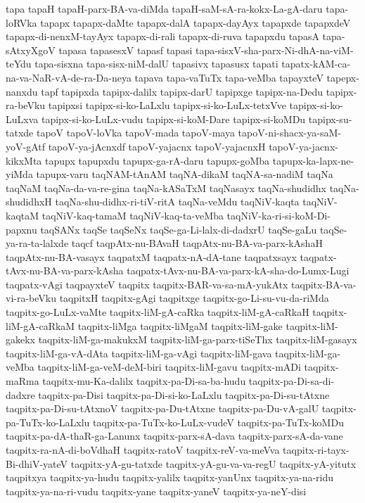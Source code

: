 {tapa
tapaH
tapaH-parx-BA-va-diMda
tapaH-saM-sA-ra-kokx-La-gA-daru
tapa-loRVka
tapapx
tapapx-daMte
tapapx-dalA
tapapx-dayAyx
tapapxde
tapapxdeV
tapapx-di-nenxM-tayAyx
tapapx-di-rali
tapapx-di-ruva
tapapxdu
tapasA
tapa-sAtxyXgoV
tapasa
tapasesxV
tapasf
tapasi
tapa-sisxV-sha-parx-Ni-dhA-na-viM-teYdu
tapa-sisxna
tapa-sisx-niM-dalU
tapasivx
tapasusx
tapati
tapatx-kAM-ca-na-va-NaR-vA-de-ra-Da-neya
tapava
tapa-vaTuTx
tapa-veMba
tapayxteV
tapepx-nanxdu
tapf
tapipxda
tapipx-dalilx
tapipx-darU
tapipxge
tapipx-na-Dedu
tapipx-ra-beVku
tapipxsi
tapipx-si-ko-LaLxlu
tapipx-si-ko-LuLx-tetxVve
tapipx-si-ko-LuLxva
tapipx-si-ko-LuLx-vudu
tapipx-si-koM-Dare
tapipx-si-koMDu
tapipx-su-tatxde
tapoV
tapoV-loVka
tapoV-mada
tapoV-maya
tapoV-ni-shacx-ya-saM-yoV-gAtf
tapoV-ya-jAcnxdf
tapoV-yajacnx
tapoV-yajacnxH
tapoV-ya-jacnx-kikxMta
tapupx
tapupxdu
tapupx-ga-rA-daru
tapupx-goMba
tapupx-ka-lapx-ne-yiMda
tapupx-varu
taqNAM-tAnAM
taqNA-dikaM
taqNA-sa-nadiM
taqNa
taqNaM
taqNa-da-va-re-gina
taqNa-kASaTxM
taqNasayx
taqNa-shudidhx
taqNa-shudidhxH
taqNa-shu-didhx-ri-tiV-ritA
taqNa-veMdu
taqNiV-kaqta
taqNiV-kaqtaM
taqNiV-kaq-tamaM
taqNiV-kaq-ta-veMba
taqNiV-ka-ri-si-koM-Di-papxnu
taqSANx
taqSe
taqSeNx
taqSe-ga-Li-lalx-di-dadxrU
taqSe-gaLu
taqSe-ya-ra-ta-lalxde
taqcf
taqpAtx-nu-BAvaH
taqpAtx-nu-BA-va-parx-kAshaH
taqpAtx-nu-BA-vasayx
taqpatxM
taqpatx-nA-dA-tane
taqpatxsayx
taqpatx-tAvx-nu-BA-va-parx-kAsha
taqpatx-tAvx-nu-BA-va-parx-kA-sha-do-Lumx-Lugi
taqpatx-vAgi
taqpayxteV
taqpitx
taqpitx-BAR-va-sa-mA-yukAtx
taqpitx-BA-va-vi-ra-beVku
taqpitxH
taqpitx-gAgi
taqpitxge
taqpitx-go-Li-su-vu-da-riMda
taqpitx-go-LuLx-vaMte
taqpitx-liM-gA-caRka
taqpitx-liM-gA-caRkaH
taqpitx-liM-gA-caRkaM
taqpitx-liMga
taqpitx-liMgaM
taqpitx-liM-gake
taqpitx-liM-gakekx
taqpitx-liM-ga-makukxM
taqpitx-liM-ga-parx-tiSeThx
taqpitx-liM-gasayx
taqpitx-liM-ga-vA-dAta
taqpitx-liM-ga-vAgi
taqpitx-liM-gava
taqpitx-liM-ga-veMba
taqpitx-liM-ga-veM-deM-biri
taqpitx-liM-gavu
taqpitx-mADi
taqpitx-maRma
taqpitx-mu-Ka-dalilx
taqpitx-pa-Di-sa-ba-hudu
taqpitx-pa-Di-sa-di-dadxre
taqpitx-pa-Disi
taqpitx-pa-Di-si-ko-LaLxlu
taqpitx-pa-Di-su-tAtxne
taqpitx-pa-Di-su-tAtxnoV
taqpitx-pa-Du-tAtxne
taqpitx-pa-Du-vA-galU
taqpitx-pa-TuTx-ko-LaLxlu
taqpitx-pa-TuTx-ko-LuLx-vudeV
taqpitx-pa-TuTx-koMDu
taqpitx-pa-dA-thaR-ga-Lanunx
taqpitx-parx-sA-dava
taqpitx-parx-sA-da-vane
taqpitx-ra-nA-di-boVdhaH
taqpitx-ratoV
taqpitx-reV-va-meVva
taqpitx-ri-tayx-Bi-dhiV-yateV
taqpitx-yA-gu-tatxde
taqpitx-yA-gu-va-va-regU
taqpitx-yA-yitutx
taqpitxya
taqpitx-ya-hudu
taqpitx-yalilx
taqpitx-yanUnx
taqpitx-ya-na-ridu
taqpitx-ya-na-ri-vudu
taqpitx-yane
taqpitx-yaneV
taqpitx-ya-neY-disi
}
